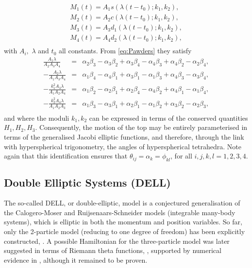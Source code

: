 \documentclass[fleqn,11pt,twoside]{article}
\theoremstyle{definition}
\begin{document}
\begin{equation}
\begin{array}{c}
M_1(t)=A_1s(\lambda(t-t_0);k_1,k_2),\\
M_2(t)=A_2c(\lambda(t-t_0);k_1,k_2),\\
M_3(t)=A_3d_1(\lambda(t-t_0);k_1,k_2),\\
M_4(t)=A_4d_2(\lambda(t-t_0);k_1,k_2),\\
\end{array}
\end{equation}
with $A_i,$ $\lambda$ and $t_0$ all constants. From \eqref{eq:Pawders} they satisfy 
\begin{eqnarray*}
\frac{A_1\lambda}{A_2A_3A_4}&=&\alpha_2\beta_3-\alpha_3\beta_2+\alpha_3\beta_4-\alpha_4\beta_3+\alpha_4\beta_2-\alpha_2\beta_4,\\
-\frac{A_2\lambda}{A_1A_3A_4}&=&\alpha_1\beta_4-\alpha_4\beta_1+\alpha_3\beta_1-\alpha_1\beta_3+\alpha_4\beta_3-\alpha_3\beta_4,\\
-\frac{k_1^2A_3\lambda}{A_1A_2A_4}&=&\alpha_1\beta_2-\alpha_2\beta_1+\alpha_2\beta_4-\alpha_4\beta_2+\alpha_4\beta_1-\alpha_1\beta_4,\\
-\frac{k_2^2A_4\lambda}{A_1A_2A_3}&=&\alpha_1\beta_3-\alpha_3\beta_1+\alpha_2\beta_1-\alpha_1\beta_2+\alpha_3\beta_2-\alpha_2\beta_3,\\
\end{eqnarray*}
and where the moduli $k_1,k_2$ can be expressed in terms of the 
conserved quantities $H_1,H_2,H_3$. 
Consequently, the motion of the top may be entirely parameterised in terms of the generalised Jacobi elliptic functions, and therefore, through the link with hyperspherical trigonometry, the angles of hyperspherical tetrahedra. Note again that this identification ensures that $\theta_{ij}=\alpha_k=\phi_{kl}$, for all $i,j,k,l=1,2,3,4$.

\subsection{Double Elliptic Systems (DELL)}
The so-called DELL, or double-elliptic, model is a conjectured 
generalisation of the Calogero-Moser and Ruijsenaars-Schneider models 
(integrable many-body systems), which is elliptic in both the momentum 
and position variables. So far, only the 2-particle model (reducing to 
one degree of freedom) has been explicitly 
constructed, \cite{braden,braden2}. A possible Hamiltonian for the three-particle model was later suggested in terms of Riemann theta 
functions, \cite{Aminov,MirMor}, supported by numerical evidence in 
\cite{MirMor}, although it remained to be proven. 
\end{document}
